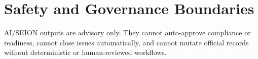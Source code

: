 \section{Safety and Governance Boundaries}
AI/SEION outputs are advisory only. They cannot auto-approve compliance or readiness, cannot close issues automatically, and cannot mutate official records without deterministic or human-reviewed workflows.

